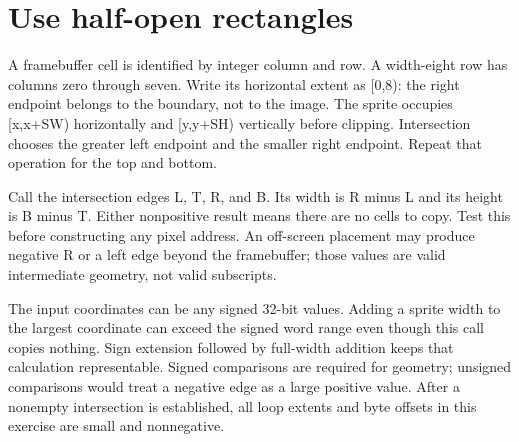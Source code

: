 \section{Use half-open rectangles}\label{blit-geometry}
A framebuffer cell is identified by integer column and row. A width-eight row has columns zero through seven. Write its horizontal extent as [0,8): the right endpoint belongs to the boundary, not to the image. The sprite occupies [x,x+SW) horizontally and [y,y+SH) vertically before clipping. Intersection chooses the greater left endpoint and the smaller right endpoint. Repeat that operation for the top and bottom.

Call the intersection edges L, T, R, and B. Its width is R minus L and its height is B minus T. Either nonpositive result means there are no cells to copy. Test this before constructing any pixel address. An off-screen placement may produce negative R or a left edge beyond the framebuffer; those values are valid intermediate geometry, not valid subscripts.

The input coordinates can be any signed 32-bit values. Adding a sprite width to the largest coordinate can exceed the signed word range even though this call copies nothing. Sign extension followed by full-width addition keeps that calculation representable. Signed comparisons are required for geometry; unsigned comparisons would treat a negative edge as a large positive value. After a nonempty intersection is established, all loop extents and byte offsets in this exercise are small and nonnegative.
